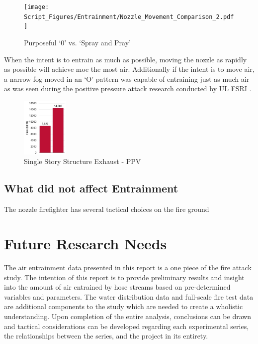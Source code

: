 \documentclass[12pt,oneside]{book}
\begin{document}
\begin{figure}[!ht]
\centering
\texttt{[image: Script\_Figures/Entrainment/Nozzle\_Movement\_Comparison\_2.pdf]}
\caption{Purposeful `0' vs. `Spray and Pray'}
\label{fig:Pattern_Compare_2}
\end{figure}

When the intent is to entrain as much as possible, moving the nozzle as rapidly as possible will achieve moe the most air. Additionally if the intent is to move air, a narrow fog moved in an `O' pattern was capable of entraining just as much air as was seen during the positive pressure attack research conducted by UL FSRI \cite{Zevotek_Kerber:2016}. 

\begin{figure}[!ht]
\centering
\includegraphics[width=0.2\textwidth]{Figures/Air_Entrainment/PPV_Comparison.png}
\caption{Single Story Structure Exhaust - PPV \cite{Zevotek_Kerber:2016}}
\label{fig:PPV}
\end{figure}


\section{What did not affect Entrainment}
The nozzle firefighter has several tactical choices on the fire ground 


\chapter{Future Research Needs}

The air entrainment data presented in this report is a one piece of the fire attack study. The intention of this report is to provide preliminary results and insight into the amount of air entrained by hose streams based on pre-determined variables and parameters. The water distribution data and full-scale fire test data are additional components to the study which are needed to create a wholistic understanding. Upon completion of the entire analysis, conclusions can be drawn and tactical considerations can be developed regarding each experimental series, the relationships between the series, and the project in its entirety.  
\end{document}
